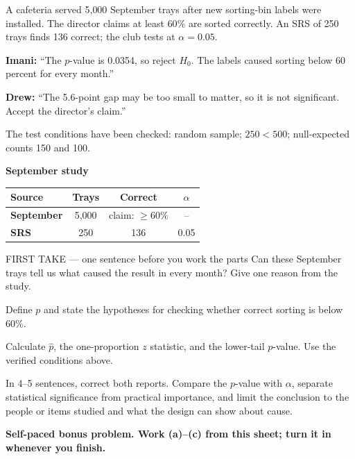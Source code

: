 \documentclass[14pt]{extarticle}
\begin{document}
\pagestyle{empty}


\noindent\begin{minipage}[t]{0.57\linewidth}
\vspace{0pt}
A cafeteria served 5{,}000 September trays after new sorting-bin labels were installed. The director claims at least $60\%$ are sorted correctly. An SRS of 250 trays finds 136 correct; the club tests at $\alpha=0.05$.\par\smallskip \textbf{Imani:} ``The $p$-value is 0.0354, so reject $H_0$. The labels caused sorting below 60 percent for every month.''\par \textbf{Drew:} ``The 5.6-point gap may be too small to matter, so it is not significant. Accept the director's claim.''\par\smallskip The test conditions have been checked: random sample; $250<500$; null-expected counts 150 and 100.\par
\end{minipage}\hfill
\begin{minipage}[t]{0.40\linewidth}
\vspace{0pt}
\begin{center}
\textbf{September study}\par\smallskip
\begin{tabular}{|l|c|c|c|}
\hline
\textbf{Source} & \textbf{Trays} & \textbf{Correct} & \textbf{$\alpha$} \\ \hline
\textbf{September} & 5,000 & claim: $\geq 60\%$ & -- \\ \hline
\textbf{SRS} & 250 & 136 & 0.05 \\ \hline
\end{tabular}
\end{center}
\end{minipage}

\begin{firsttakebox}{FIRST TAKE --- one sentence before you work the parts}
Can these September trays tell us what caused the result in every month? Give one reason from the study.
\end{firsttakebox}

\begin{description}[leftmargin=1.15in, labelwidth=1in, itemsep=2pt, topsep=2pt]
  \item[\dokbadge{1}~(a)] Define $p$ and state the hypotheses for checking whether correct sorting is below 60\%.
  \item[\dokbadge{2}~(b)] Calculate $\widehat p$, the one-proportion $z$ statistic, and the lower-tail $p$-value. Use the verified conditions above.
  \item[\dokbadge{3}~(c)] In 4--5 sentences, correct both reports. Compare the $p$-value with $\alpha$, separate statistical significance from practical importance, and limit the conclusion to the people or items studied and what the design can show about cause.
\end{description}

\vfill
\textbf{Self-paced bonus problem. Work (a)--(c) from this sheet; turn it in whenever you finish.}
\end{document}
